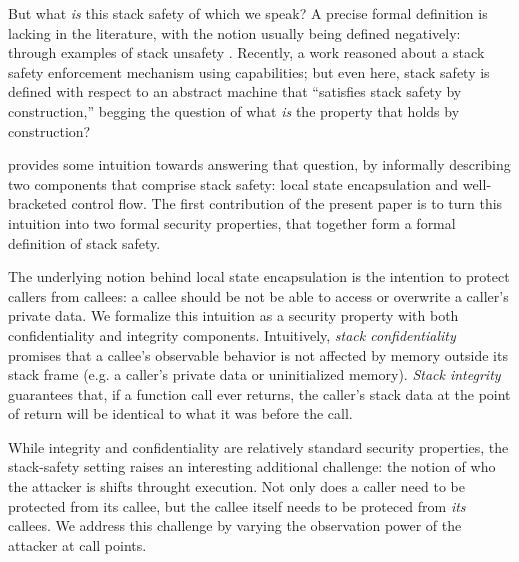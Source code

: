 \documentclass[acmsmall,review,anonymous]{acmart}\settopmatter{printfolios=true,printccs=false,printacmref=false}
\begin{document}
But what {\em is} this stack safety of which we speak? A precise formal
definition is lacking in the literature, with the notion usually being
defined negatively: through examples of stack unsafety
.
Recently, a  work reasoned
about a stack safety enforcement mechanism using capabilities;
but even here, stack safety is defined with respect to an abstract
machine that ``satisfies stack safety by construction,'' begging
the question of what {\em is} the property that holds by construction?

 provides some intuition towards answering that question,
by informally describing two components that comprise stack safety:
local state encapsulation and well-bracketed control flow. The first
contribution of the present paper is to
turn this intuition into two formal  security properties,
that together form a formal definition of stack safety.

The underlying notion behind local state encapsulation is the
intention to protect callers from callees: a callee should be not be
able to access or overwrite a caller's private data. We formalize this
intuition as a security property with both confidentiality and
integrity components.
%
Intuitively, {\em stack confidentiality} promises that a callee's
observable behavior is not affected by memory outside its stack frame
(e.g. a caller's private data or uninitialized memory).  {\em Stack
  integrity} guarantees that, if a function call ever returns, the caller's
stack data at the point of return will be identical to what it was before
the call.  

While integrity and confidentiality are relatively standard security
properties, the stack-safety setting raises an interesting additional
challenge:
the notion of who the attacker is shifts throught execution. Not only
does a caller need to be protected from its callee, but the callee
itself needs to be proteced from {\em its} callees.
We address this challenge by varying the observation power
of the attacker at call points.
\end{document}
